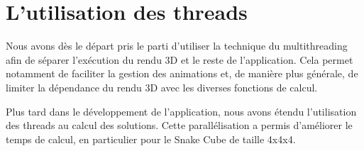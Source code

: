 \section{L'utilisation des threads}
Nous avons dès le départ pris le parti d'utiliser la technique du multithreading afin de séparer l’exécution du rendu 3D et le reste de l'application. Cela permet notamment de faciliter la gestion des animations et, de manière plus générale, de limiter la dépendance du rendu 3D avec les diverses fonctions de calcul. 

Plus tard dans le développement de l'application, nous avons étendu l'utilisation des threads au calcul des solutions. Cette parallélisation a permis d'améliorer le temps de calcul, en particulier pour le Snake Cube de taille 4x4x4.